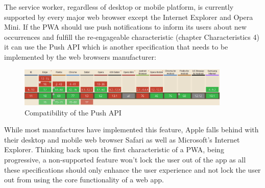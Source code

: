 The service worker, regardless of desktop or mobile platform, is currently supported by every major web browser except the Internet Explorer and Opera Mini. 
\newline
If the PWA should use push notifications to inform its users about new occurrences and fulfill the re-engageable characteristic (chapter Characteristics 4) it can use the Push API which is another specification that needs to be implemented by the web browsers manufacturer: 

\begin{figure}[htbp] 
	\centering
	\includegraphics[width=0.9\textwidth]{Assets/chapter_pwa/pushapisupport.PNG}
	\caption{Compatibility of the Push API}
	\label{fig:pwa_comptaibility_pushapi}
\end{figure}

While most manufactures have implemented this feature, Apple falls behind with their desktop and mobile web browser Safari as well as Microsoft’s Internet Explorer.
\newline
Thinking back upon the first characteristic of a PWA, being progressive, a non-supported feature won’t lock the user out of the app as all these specifications should only enhance the user experience and not lock the user out from using the core functionality of a web app.